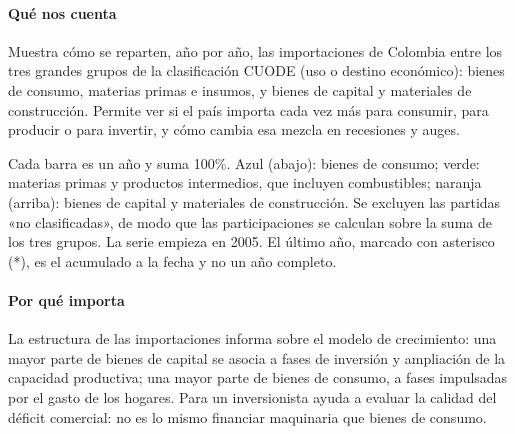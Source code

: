 \paragraph{Qué nos cuenta}
Muestra cómo se reparten, año por año, las importaciones de Colombia entre los tres grandes grupos de la clasificación CUODE (uso o destino económico): bienes de consumo, materias primas e insumos, y bienes de capital y materiales de construcción. Permite ver si el país importa cada vez más para consumir, para producir o para invertir, y cómo cambia esa mezcla en recesiones y auges.

\begin{leer}
Cada barra es un año y suma 100\%. Azul (abajo): bienes de consumo; verde: materias primas y productos intermedios, que incluyen combustibles; naranja (arriba): bienes de capital y materiales de construcción. Se excluyen las partidas «no clasificadas», de modo que las participaciones se calculan sobre la suma de los tres grupos. La serie empieza en 2005. El último año, marcado con asterisco (*), es el acumulado a la fecha y no un año completo.
\end{leer}

\paragraph{Por qué importa}
La estructura de las importaciones informa sobre el modelo de crecimiento: una mayor parte de bienes de capital se asocia a fases de inversión y ampliación de la capacidad productiva; una mayor parte de bienes de consumo, a fases impulsadas por el gasto de los hogares. Para un inversionista ayuda a evaluar la calidad del déficit comercial: no es lo mismo financiar maquinaria que bienes de consumo.

